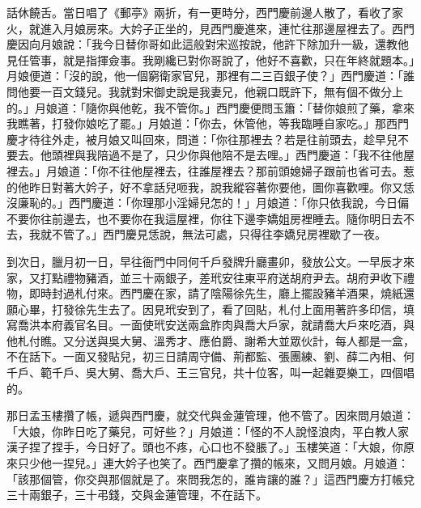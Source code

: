 話休饒舌。當日唱了《郵亭》兩折，有一更時分，西門慶前邊人散了，看收了家火，就進入月娘房來。大妗子正坐的，見西門慶進來，連忙往那邊屋裡去了。西門慶因向月娘說：「我今日替你哥如此這般對宋巡按說，他許下除加升一級，還教他見任管事，就是指揮僉事。我剛纔已對你哥說了，他好不喜歡，只在年終就題本。」月娘便道：「沒的說，他一個窮衛家官兒，那裡有二三百銀子使？」西門慶道：「誰問他要一百文錢兒。我就對宋御史說是我妻兄，他親口既許下，無有個不做分上的。」月娘道：「隨你與他乾，我不管你。」西門慶便問玉簫：「替你娘煎了藥，拿來我瞧著，打發你娘吃了罷。」月娘道：「你去，休管他，等我臨睡自家吃。」那西門慶才待往外走，被月娘又叫回來，問道：「你往那裡去？若是往前頭去，趁早兒不要去。他頭裡與我陪過不是了，只少你與他陪不是去哩。」西門慶道：「我不往他屋裡去。」月娘道：「你不往他屋裡去，往誰屋裡去？那前頭媳婦子跟前也省可去。惹的他昨日對著大妗子，好不拿話兒咂我，說我縱容著你要他，圖你喜歡哩。你又恁沒廉恥的。」西門慶道：「你理那小淫婦兒怎的！」月娘道：「你只依我說，今日偏不要你往前邊去，也不要你在我這屋裡，你往下邊李嬌姐房裡睡去。隨你明日去不去，我就不管了。」西門慶見恁說，無法可處，只得往李嬌兒房裡歇了一夜。

到次日，臘月初一日，早往衙門中同何千戶發牌升廳畫卯，發放公文。一早辰才來家，又打點禮物豬酒，並三十兩銀子，差玳安往東平府送胡府尹去。胡府尹收下禮物，即時封過札付來。西門慶在家，請了陰陽徐先生，廳上擺設豬羊酒果，燒紙還願心畢，打發徐先生去了。因見玳安到了，看了回貼，札付上面用著許多印信，填寫喬洪本府義官名目。一面使玳安送兩盒胙肉與喬大戶家，就請喬大戶來吃酒，與他札付瞧。又分送與吳大舅、溫秀才、應伯爵、謝希大並眾伙計，每人都是一盒，不在話下。一面又發貼兒，初三日請周守備、荊都監、張團練、劉、薛二內相、何千戶、範千戶、吳大舅、喬大戶、王三官兒，共十位客，叫一起雜耍樂工，四個唱的。

那日孟玉樓攢了帳，遞與西門慶，就交代與金蓮管理，他不管了。因來問月娘道：「大娘，你昨日吃了藥兒，可好些？」月娘道：「怪的不人說怪浪肉，平白教人家漢子捏了捏手，今日好了。頭也不疼，心口也不發脹了。」玉樓笑道：「大娘，你原來只少他一捏兒。」連大妗子也笑了。西門慶拿了攢的帳來，又問月娘。月娘道：「該那個管，你交與那個就是了。來問我怎的，誰肯讓的誰？」這西門慶方打帳兌三十兩銀子，三十弔錢，交與金蓮管理，不在話下。

